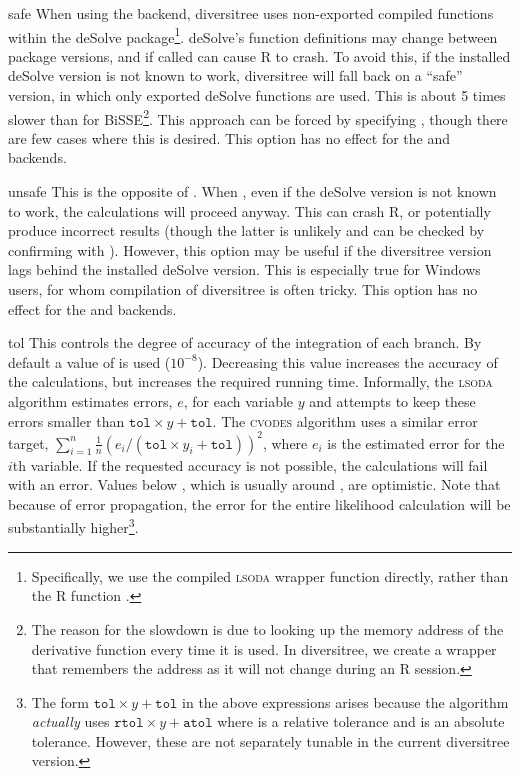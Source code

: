\documentclass[12pt,twoside]{article}
\newenvironment{cdescription}{\begin{description}[font=\tt,leftmargin=4em,labelindent=2em,noitemsep]\addtolength{\parskip}{.75ex}}{\end{description}}
\begin{document}
\begin{cdescription}
\item[safe] When using the  backend, diversitree uses
  non-exported compiled functions within the deSolve
  package\footnote{Specifically, we use the compiled \textsc{lsoda}
    wrapper function  directly, rather than the R
    function .}.  deSolve's function definitions may
  change between package versions, and if called can cause R to crash.
  To avoid this, if the installed deSolve version is not known to
  work, diversitree will fall back on a ``safe'' version, in which
  only exported deSolve functions are used.  This is about 5 times
  slower than  for BiSSE\footnote{The reason for the
    slowdown is due to looking up the memory address of the derivative
    function every time it is used.  In diversitree, we create a
    wrapper that remembers the address as it will not change during an
    R session.}.  This approach can be forced by specifying
  , though there are few cases where this is desired.
  This option has no effect for the  and 
  backends.

\item[unsafe] This is the opposite of .  When ,
  even if the deSolve version is not known to work, the calculations
  will proceed anyway.  This can crash R, or potentially produce
  incorrect results (though the latter is unlikely and can be checked
  by confirming with ).  However, this option may be
  useful if the diversitree version lags behind the installed deSolve
  version.  This is especially true for Windows users, for whom
  compilation of diversitree is often tricky.
  This option has no effect for the  and 
  backends.
  
\item[tol] This controls the degree of accuracy of the integration of
  each branch.  By default a value of  is used
  ($10^{-8}$).  Decreasing this value increases the accuracy of the
  calculations, but increases the required running time.
  Informally, the \textsc{lsoda} algorithm estimates errors, $e$, for
  each variable $y$ and attempts to keep these errors smaller than
  $\mathtt{tol} \times y + \mathtt{tol}$.
  The \textsc{cvodes} algorithm uses a similar error target, $\sum_{i=1}^n
  \frac{1}{n}(e_i/(\mathtt{tol} \times y_i + \mathtt{tol}))^2$, where
  $e_i$ is the estimated error for the $i$th variable.
  If the requested accuracy is not possible, the calculations will
  fail with an error.  Values below ,
  which is usually around , are optimistic.
  Note that because of error propagation, the error for the entire
  likelihood calculation will be substantially higher\footnote{The
    form $\mathtt{tol} \times y + \mathtt{tol}$ in the above
    expressions arises because the algorithm \textit{actually} uses
    $\mathtt{rtol} \times y + \mathtt{atol}$ where  is a
    relative tolerance and  is an absolute tolerance.
    However, these are not separately tunable in the current
    diversitree version.}.


\end{cdescription}
\end{document}
